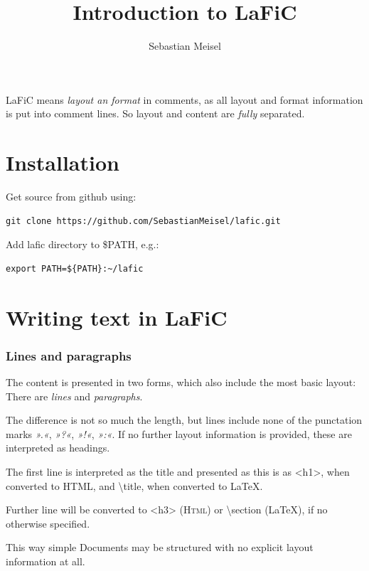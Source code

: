 \documentclass{article}
\title{Introduction to LaFiC}
\author{Sebastian Meisel}
\begin{document}
\maketitle


LaFiC means \emph{layout an format} in comments, as all layout and
format information is put into comment lines. So layout and
content are \emph{fully} separated.

\part{Installation}

Get source from github using:

\begin{verbatim}
git clone https://github.com/SebastianMeisel/lafic.git

\end{verbatim}

Add lafic directory to \$PATH, e.g.:

\begin{verbatim}
export PATH=${PATH}:~/lafic

\end{verbatim}

\part{Writing text in LaFiC}

\section{Lines and paragraphs}

The content is presented in two forms, which also include
the most basic layout: There are \emph{lines} and \emph{paragraphs}.

The difference is not so much the length, but lines include
none of the punctation marks \emph{».«}, \emph{»?«}, \emph{»!«}, \emph{»:«}. If no
further layout information is provided, these are
interpreted as headings.

The first line is interpreted as the title and presented as
this is as <h1>, when converted to HTML, and \textbackslash title, when 
converted to LaTeX.

Further line will be converted to <h3> (\textsc{Html}) or \textbackslash section
(LaTeX), if no otherwise specified.

This way simple Documents may be structured with no explicit
layout information at all.
\end{document}
